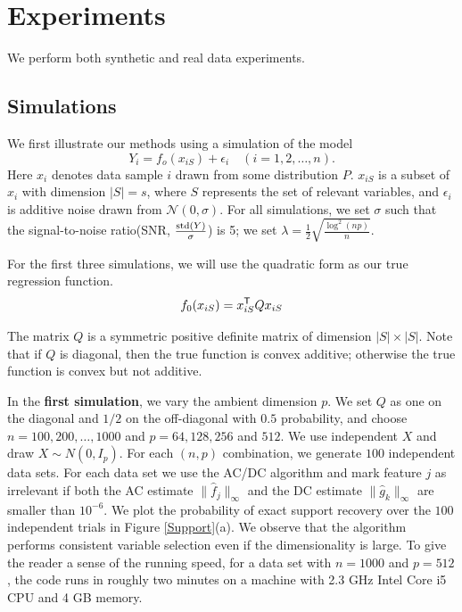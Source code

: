 \def\x{x}
\def\Q{Q}
\def\bds#1{#1}
\def\tts#1{\texttt{\small #1}}

\section{Experiments}
\label{sec:thesims}

We perform both synthetic and real data experiments.

\subsection{Simulations}
We first illustrate our methods using a simulation of the model
\begin{equation}\nonumber
         Y_i = f_o(\x_{iS}) + \epsilon_i \quad (i=1,2,\ldots,n).
\end{equation}
Here $\x_{i}$ denotes data sample $i$ drawn from some distribution $P$. 
$\x_{iS}$ is a subset of $\x_i$ with dimension $|S|=s$, where $S$
represents the set of relevant variables, and 
$\epsilon_i$ is additive noise drawn from $\mathcal{N}(0,\sigma)$. For 
all simulations, we set $\sigma$ such that the signal-to-noise ratio(SNR, $\frac{\textrm{std}(Y)}{\sigma}$) is 5; we
set $\lambda = \frac{1}{2} \sqrt{ \frac{\log^2(np)}{n} }$.

For the first three simulations, we will use the quadratic form as our true regression function.
\[
f_0(x_{iS}) = x_{iS}^\tran \Q x_{iS}
\]

The matrix $\Q$ is a symmetric positive definite matrix of dimension $|S|\times{}|S|$. 
Note that if $\Q$ is diagonal, then the true function is convex
additive; 
otherwise the true function is convex but not additive.

In the \textbf{first simulation}, we vary the ambient dimension $p$. We set $Q$ as one on the diagonal and $1/2$ on the off-diagonal with $0.5$ probability, and choose $n=100, 200,\ldots,1000$ and $p=64,128,256$ and $512$. We use independent $X$ and draw $X \sim N(0, I_p)$.
For each $(n,p)$ combination, we generate $100$ independent data
sets. For each data set we use the AC/DC algorithm and mark feature $j$ as irrelevant if both the AC estimate $\| \hat{f}_j \|_\infty$ and the DC estimate $\| \hat{g}_k \|_\infty$ are smaller than $10^{-6}$.
We plot the probability of exact
support recovery over the $100$ independent trials in Figure \ref{Support}(a).  We
observe that the algorithm performs consistent variable selection even if the dimensionality is large. To give the reader a
sense of the running speed, for a 
data set with $n=1000$ and $p=512$, the code runs in roughly two 
minutes on a machine with 2.3 GHz Intel Core i5 CPU and 4 GB memory.

